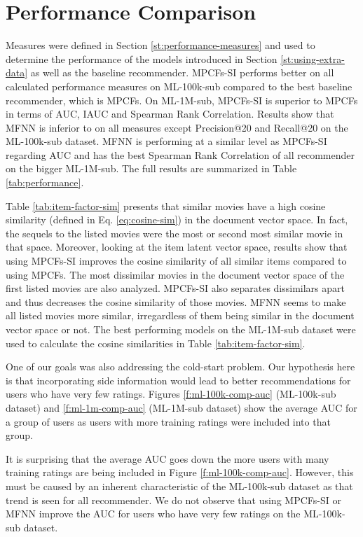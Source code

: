 \section{Performance Comparison}
\label{st:performance-comparison}


Measures were defined in Section \ref{st:performance-measures} and used to determine the performance of the models introduced in Section \ref{st:using-extra-data} as well as the baseline recommender.
MPCFs-SI performs better on all calculated performance measures on ML-100k-sub compared to the best baseline recommender, which is MPCFs.
On ML-1M-sub, MPCFs-SI is superior to MPCFs in terms of AUC, IAUC and Spearman Rank Correlation.
Results show that MFNN is inferior to  on all measures except Precision@20 and Recall@20 on the ML-100k-sub dataset.
MFNN is performing at a similar level as MPCFs-SI regarding AUC and has the best Spearman Rank Correlation of all recommender on the bigger ML-1M-sub.
The full results are summarized in Table \ref{tab:performance}.

Table \ref{tab:item-factor-sim} presents that similar movies have a high cosine similarity (defined in Eq. \ref{eq:cosine-sim}) in the document vector space.
In fact, the sequels to the listed movies were the most or second most similar movie in that space.
Moreover, looking at the item latent vector space, results show that using MPCFs-SI improves the cosine similarity of all similar items compared to using MPCFs.
The most dissimilar movies in the document vector space of the first listed movies are also analyzed.
MPCFs-SI also separates dissimilars apart and thus decreases the cosine similarity of those movies.
MFNN seems to make all listed movies more similar, irregardless of them being similar in the document vector space or not.
The best performing models on the ML-1M-sub dataset were used to calculate the cosine similarities in Table \ref{tab:item-factor-sim}.

One of our goals was also addressing the cold-start problem.
Our hypothesis here is that incorporating side information would lead to better recommendations for users who have very few ratings.
Figures \ref{f:ml-100k-comp-auc} (ML-100k-sub dataset) and \ref{f:ml-1m-comp-auc} (ML-1M-sub dataset) show the average AUC for a group of users as users with more training ratings were included into that group.

It is surprising that the average AUC goes down the more users with many training ratings are being included in Figure \ref{f:ml-100k-comp-auc}.
However, this must be caused by an inherent characteristic of the ML-100k-sub dataset as that trend is seen for all recommender.
We do not observe that using MPCFs-SI or MFNN improve the AUC for users who have very few ratings on the ML-100k-sub dataset.

